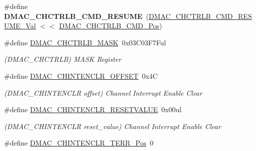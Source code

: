 \begin{DoxyCompactItemize}
\item 
\hypertarget{group___s_a_m_l21___d_m_a_c_gafcf78e3236b28cb6252bab80614d2f95}{}\#define {\bfseries D\+M\+A\+C\+\_\+\+C\+H\+C\+T\+R\+L\+B\+\_\+\+C\+M\+D\+\_\+\+R\+E\+S\+U\+M\+E}~(\hyperlink{group___s_a_m_l21___d_m_a_c_gae6fef8dd26d28de1cb7d870aa5d2b253}{D\+M\+A\+C\+\_\+\+C\+H\+C\+T\+R\+L\+B\+\_\+\+C\+M\+D\+\_\+\+R\+E\+S\+U\+M\+E\+\_\+\+Val}   $<$$<$ \hyperlink{group___s_a_m_l21___d_m_a_c_ga7a6624b9ffc32912d6db81c95a81be97}{D\+M\+A\+C\+\_\+\+C\+H\+C\+T\+R\+L\+B\+\_\+\+C\+M\+D\+\_\+\+Pos})\label{group___s_a_m_l21___d_m_a_c_gafcf78e3236b28cb6252bab80614d2f95}

\item 
\hypertarget{group___s_a_m_l21___d_m_a_c_gaf5f6415e0cfb9acbeb58874888edcbe9}{}\#define \hyperlink{group___s_a_m_l21___d_m_a_c_gaf5f6415e0cfb9acbeb58874888edcbe9}{D\+M\+A\+C\+\_\+\+C\+H\+C\+T\+R\+L\+B\+\_\+\+M\+A\+S\+K}~0x03\+C03\+F7\+Ful\label{group___s_a_m_l21___d_m_a_c_gaf5f6415e0cfb9acbeb58874888edcbe9}

\begin{DoxyCompactList}\small\item\em (D\+M\+A\+C\+\_\+\+C\+H\+C\+T\+R\+L\+B) M\+A\+S\+K Register \end{DoxyCompactList}\item 
\hypertarget{group___s_a_m_l21___d_m_a_c_gacdf58e67992136562ea21ed243cfd4be}{}\#define \hyperlink{group___s_a_m_l21___d_m_a_c_gacdf58e67992136562ea21ed243cfd4be}{D\+M\+A\+C\+\_\+\+C\+H\+I\+N\+T\+E\+N\+C\+L\+R\+\_\+\+O\+F\+F\+S\+E\+T}~0x4\+C\label{group___s_a_m_l21___d_m_a_c_gacdf58e67992136562ea21ed243cfd4be}

\begin{DoxyCompactList}\small\item\em (D\+M\+A\+C\+\_\+\+C\+H\+I\+N\+T\+E\+N\+C\+L\+R offset) Channel Interrupt Enable Clear \end{DoxyCompactList}\item 
\hypertarget{group___s_a_m_l21___d_m_a_c_ga605cb951c3e2debb4b5800d015862810}{}\#define \hyperlink{group___s_a_m_l21___d_m_a_c_ga605cb951c3e2debb4b5800d015862810}{D\+M\+A\+C\+\_\+\+C\+H\+I\+N\+T\+E\+N\+C\+L\+R\+\_\+\+R\+E\+S\+E\+T\+V\+A\+L\+U\+E}~0x00ul\label{group___s_a_m_l21___d_m_a_c_ga605cb951c3e2debb4b5800d015862810}

\begin{DoxyCompactList}\small\item\em (D\+M\+A\+C\+\_\+\+C\+H\+I\+N\+T\+E\+N\+C\+L\+R reset\+\_\+value) Channel Interrupt Enable Clear \end{DoxyCompactList}\item 
\hypertarget{group___s_a_m_l21___d_m_a_c_ga7896201350f25ec31ca8231659c0faee}{}\#define \hyperlink{group___s_a_m_l21___d_m_a_c_ga7896201350f25ec31ca8231659c0faee}{D\+M\+A\+C\+\_\+\+C\+H\+I\+N\+T\+E\+N\+C\+L\+R\+\_\+\+T\+E\+R\+R\+\_\+\+Pos}~0\label{group___s_a_m_l21___d_m_a_c_ga7896201350f25ec31ca8231659c0faee}


\end{DoxyCompactItemize}

